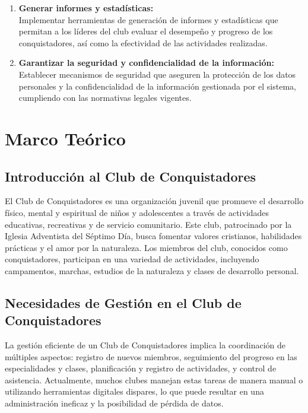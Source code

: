\documentclass[stu, 12pt, letterpaper, donotrepeattitle, floatsintext, natbib]{apa7}
\begin{document}
\begin{enumerate}
        \item\textbf{Generar informes y estad\'isticas:}\\Implementar herramientas de generaci\'on de informes y estad\'isticas que permitan a los l\'ideres del club evaluar el desempe\~{n}o y progreso de los conquistadores, as\'i como la efectividad de las actividades realizadas.
        \item\textbf{Garantizar la seguridad y confidencialidad de la informaci\'on:}\\Establecer mecanismos de seguridad que aseguren la protecci\'on de los datos personales y la confidencialidad de la informaci\'on gestionada por el sistema, cumpliendo con las normativas legales vigentes.
    \end{enumerate}


    \section{Marco Te\'orico}

    \subsection{Introducci\'on al Club de Conquistadores}
    El Club de Conquistadores es una organizaci\'on juvenil que promueve el desarrollo f\'isico, mental y espiritual de ni\~{n}os y adolescentes a trav\'es de actividades educativas, recreativas y de servicio comunitario. Este club, patrocinado por la Iglesia Adventista del S\'eptimo D\'ia, busca fomentar valores cristianos, habilidades pr\'acticas y el amor por la naturaleza. Los miembros del club, conocidos como conquistadores, participan en una variedad de actividades, incluyendo campamentos, marchas, estudios de la naturaleza y clases de desarrollo personal.

    \subsection{Necesidades de Gesti\'on en el Club de Conquistadores}
    La gesti\'on eficiente de un Club de Conquistadores implica la coordinaci\'on de m\'ultiples aspectos: registro de nuevos miembros, seguimiento del progreso en las especialidades y clases, planificaci\'on y registro de actividades, y control de asistencia. Actualmente, muchos clubes manejan estas tareas de manera manual o utilizando herramientas digitales dispares, lo que puede resultar en una administraci\'on ineficaz y la posibilidad de p\'erdida de datos.
\end{document}
